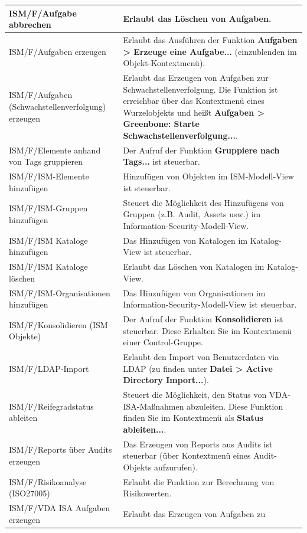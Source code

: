 \documentclass[a4paper,10pt]{book}
\begin{document}
\begin{longtable}{| p{5cm} | p{6cm} |}
ISM/F/Aufgabe abbrechen & Erlaubt das Löschen von Aufgaben. \\[10pt] \hline
ISM/F/Aufgaben erzeugen & Erlaubt das Ausführen der Funktion \textbf{Aufgaben >
Erzeuge eine Aufgabe...} (einzublenden im Objekt-Kontextmenü). \\[10pt] \hline
ISM/F/Aufgaben (Schwachstellenverfolgung) erzeugen & Erlaubt das
Erzeugen von Aufgaben zur Schwachstellenverfolgung. Die Funktion ist erreichbar
über das Kontextmenü eines Wurzelobjekts und heißt \textbf{Aufgaben >
Greenbone: Starte Schwachstellenverfolgung...}. \\[10pt] \hline
ISM/F/Elemente anhand von Tags gruppieren & Der Aufruf der Funktion
\textbf{Gruppiere nach Tags...} ist steuerbar. \\[10pt] \hline
ISM/F/ISM-Elemente hinzufügen & Hinzufügen von Objekten im ISM-Modell-View ist
steuerbar. \\[10pt] \hline
ISM/F/ISM-Gruppen hinzufügen & Steuert die Möglichkeit des Hinzufügens von
Gruppen (z.B. Audit, Assets usw.) im Information-Security-Modell-View. \\[10pt]
\hline
ISM/F/ISM Kataloge hinzufügen & Das Hinzufügen von Katalogen im Katalog-View
ist steuerbar. \\[10pt] \hline
ISM/F/ISM Kataloge löschen & Erlaubt das Löschen von Katalogen im Katalog-View.
\\[10pt] \hline
ISM/F/ISM-Organisationen hinzufügen & Das Hinzufügen von Organisationen im
Information-Security-Modell-View ist steuerbar. \\[10pt] \hline
ISM/F/Konsolidieren (ISM Objekte) & Der Aufruf der Funktion
\textbf{Konsolidieren} ist steuerbar. Diese Erhalten Sie im Kontextmenü einer
Control-Gruppe. \\[10pt] \hline
ISM/F/LDAP-Import & Erlaubt den Import von Benutzerdaten via LDAP (zu finden
unter \textbf{Datei > Active Directory Import...}). \\[10pt] \hline
ISM/F/Reifegradstatus ableiten & Steuert die Möglichkeit, den Status von
VDA-ISA-Maßnahmen abzuleiten. Diese Funktion finden Sie im Kontextmenü als
\textbf{Status ableiten...}. \\[10pt] \hline
ISM/F/Reports über Audits erzeugen & Das Erzeugen von Reports aus Audits ist
steuerbar (über Kontextmenü eines Audit-Objekts aufzurufen). \\[10pt] \hline
ISM/F/Risikoanalyse (ISO27005) & Erlaubt die Funktion zur Berechnung von
Risikowerten. \\[10pt] \hline
ISM/F/VDA ISA Aufgaben erzeugen & Erlaubt das Erzeugen von Aufgaben zu

\end{longtable}
\end{document}
